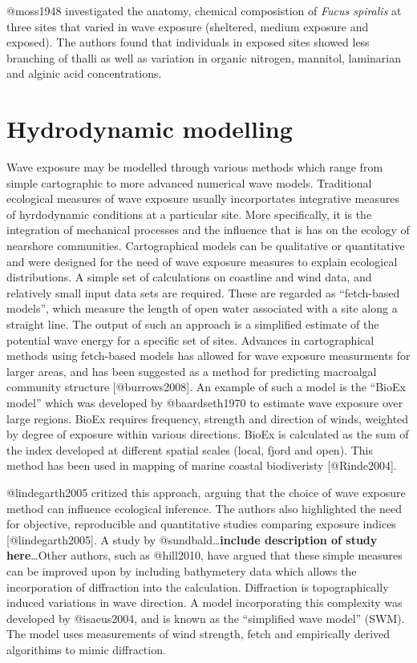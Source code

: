 \documentclass[]{article}
\begin{document}
@moss1948 investigated the anatomy, chemical composistion of \emph{Fucus
spiralis} at three sites that varied in wave exposure (sheltered, medium
exposure and exposed). The authors found that individuals in exposed
sites showed less branching of thalli as well as variation in organic
nitrogen, mannitol, laminarian and alginic acid concentrations.

\section{Hydrodynamic modelling}\label{hydrodynamic-modelling}

Wave exposure may be modelled through various methods which range from
simple cartographic to more advanced numerical wave models. Traditional
ecological measures of wave exposure usually incorportates integrative
measures of hyrdodynamic conditions at a particular site. More
specifically, it is the integration of mechanical processes and the
influence that is has on the ecology of nearshore communities.
Cartographical models can be qualitative or quantitative and were
designed for the need of wave exposure measures to explain ecological
distributions. A simple set of calculations on coastline and wind data,
and relatively small input data sets are required. These are regarded as
``fetch-based models'', which measure the length of open water
associated with a site along a straight line. The output of such an
approach is a simplified estimate of the potential wave energy for a
specific set of sites. Advances in cartographical methods using
fetch-based models has allowed for wave exposure measurments for larger
areas, and has been suggested as a method for predicting macroalgal
community structure {[}@burrows2008{]}. An example of such a model is
the ``BioEx model'' which was developed by @baardseth1970 to estimate
wave exposure over large regions. BioEx requires frequency, strength and
direction of winds, weighted by degree of exposure within various
directions. BioEx is calculated as the sum of the index developed at
different spatial scales (local, fjord and open). This method has been
used in mapping of marine coastal biodiveristy {[}@Rinde2004{]}.

@lindegarth2005 critized this approach, arguing that the choice of wave
exposure method can influence ecological inference. The authors also
highlighted the need for objective, reproducible and quantitative
studies comparing exposure indices {[}@lindegarth2005{]}. A study by
@sundbald\ldots{}\textbf{include description of study here}\ldots{}Other
authors, such as @hill2010, have argued that these simple measures can
be improved upon by including bathymetery data which allows the
incorporation of diffraction into the calculation. Diffraction is
topographically induced variations in wave direction. A model
incorporating this complexity was developed by @isaeus2004, and is known
as the ``simplified wave model'' (SWM). The model uses measurements of
wind strength, fetch and empirically derived algorithims to mimic
diffraction.
\end{document}
